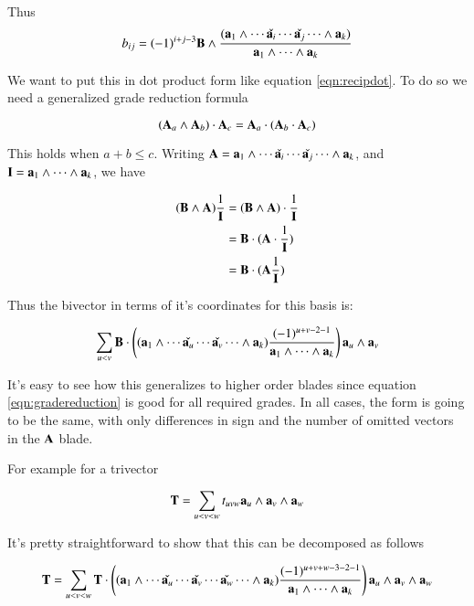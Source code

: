 \documentclass{article}      %
\begin{document}
Thus 
\begin{equation}\label{eqn:bivectorrecip}
b_{ij} = (-1)^{i+j-3}\mathbf{B} \wedge
\frac{ (\mathbf{a}_1 \wedge \cdots \check{\mathbf{a}_i} \cdots \check{\mathbf{a}_j} \cdots \wedge \mathbf{a}_k) }
{\mathbf{a}_1 \wedge \cdots \wedge \mathbf{a}_k}
\end{equation}

We want to put this in dot product form like equation \ref{eqn:recipdot}.  To do so we need a generalized grade reduction formula

\begin{equation}\label{eqn:gradereduction}
(\mathbf{A}_a \wedge \mathbf{A}_b) \cdot \mathbf{A}_c = \mathbf{A}_a \cdot (\mathbf{A}_b \cdot \mathbf{A}_c)
\end{equation}

This holds when $a + b \le c$.  Writing 
$\mathbf{A} = \mathbf{a}_1 \wedge \cdots \check{\mathbf{a}_i} \cdots \check{\mathbf{a}_j} \cdots \wedge \mathbf{a}_k$, and
$\mathbf{I} = \mathbf{a}_1 \wedge \cdots \wedge \mathbf{a}_k$, we have

\begin{align*}
(\mathbf{B} \wedge \mathbf{A}) \frac{1}{\mathbf{I}}
&= (\mathbf{B} \wedge \mathbf{A}) \cdot \frac{1}{\mathbf{I}} \\
&= \mathbf{B} \cdot (\mathbf{A} \cdot \frac{1}{\mathbf{I}}) \\
&= \mathbf{B} \cdot (\mathbf{A} \frac{1}{\mathbf{I}}) \\
\end{align*}

Thus the bivector in terms of it's coordinates for this basis is:

\begin{equation}\label{eqn:bivectordecomp}
\sum_{u<v} 
\mathbf{B} \cdot
\left(
(\mathbf{a}_1 \wedge \cdots \check{\mathbf{a}_u} \cdots \check{\mathbf{a}_v} \cdots \wedge \mathbf{a}_k)
\frac{(-1)^{u+v-2-1}}
{\mathbf{a}_1 \wedge \cdots \wedge \mathbf{a}_k}
\right)
\mathbf{a}_u \wedge \mathbf{a}_v
\end{equation}

It's easy to see how this generalizes to higher order blades since 
equation \ref{eqn:gradereduction} is good for all required grades.  In all cases, the form is going to be the same, with only differences
in sign and the number of omitted vectors in the $\mathbf{A}$ blade.

For example for a trivector

\[
\mathbf{T} = \sum_{u<v<w}t_{uvw} \mathbf{a}_u \wedge \mathbf{a}_v \wedge \mathbf{a}_w
\]

It's pretty straightforward to show that this can be decomposed as follows

\begin{equation}\label{eqn:trivectordecomp}
\mathbf{T} = \sum_{u<v<w} \mathbf{T} \cdot
\left(
(\mathbf{a}_1 \wedge \cdots \check{\mathbf{a}_u} \cdots \check{\mathbf{a}_v} \cdots \check{\mathbf{a}_w} \cdots \wedge \mathbf{a}_k)
\frac{(-1)^{u+v+w-3-2-1}}
{\mathbf{a}_1 \wedge \cdots \wedge \mathbf{a}_k}
\right)
\mathbf{a}_u \wedge \mathbf{a}_v \wedge \mathbf{a}_w
\end{equation}
\end{document}
